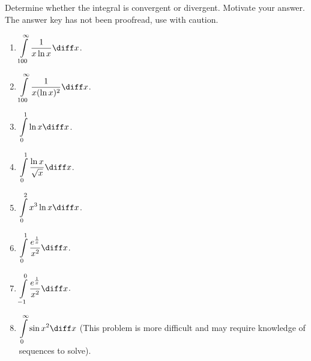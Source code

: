Determine whether the integral is convergent or divergent. Motivate your answer. The answer key has not been proofread, use with caution.

\begin{multicols}{2}
\begin{enumerate}
\item $\displaystyle \int\limits_{100}^{\infty} \frac{1}{x\ln x} \diff x$.
\item $\displaystyle \int\limits_{100}^{\infty} \frac{1}{x(\ln x)^2} \diff x$.
\item $\displaystyle \int\limits_{0}^{1}\ln x \diff x$.
\item $\displaystyle \int\limits_{0}^{1}\frac{\ln x}{\sqrt{x}} \diff x$.
\item $\displaystyle \int\limits_{0}^{2}x^3\ln x \diff x$.
\item $\displaystyle \int\limits_{0}^{1} \frac{e^{\frac{1}{x}}}{x^2} \diff x$.
\item $\displaystyle \int\limits_{-1}^{0} \frac{e^{\frac{1}{x}}}{x^2} \diff x$.
\item $\displaystyle \int \limits_{0}^{\infty}\sin x^2\diff x$ (This problem is more difficult and may require knowledge of sequences to solve).
\end{enumerate}
\end{multicols}
